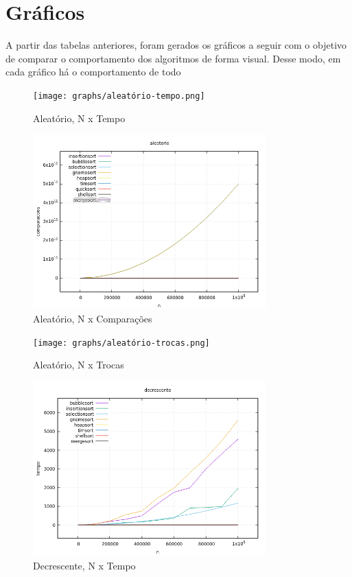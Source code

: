 \documentclass[report]{uftex}
\begin{document}
\section{Gráficos}
A partir das tabelas anteriores, foram gerados os gráficos a seguir com o objetivo de comparar o comportamento dos algoritmos de forma visual. Desse modo, em cada gráfico há o comportamento de todo

\begin{figure}[h]
\centering
\caption{Aleatório, N x Tempo}
\texttt{[image: graphs/aleatório-tempo.png]}
\end{figure}

\begin{figure}[h]
\centering
\caption{Aleatório, N x Comparações}
\includegraphics[width=0.8\textwidth]{graphs/aleatório-comparações.png}
\end{figure}

\begin{figure}[h]
\centering
\caption{Aleatório, N x Trocas}
\texttt{[image: graphs/aleatório-trocas.png]}
\end{figure}


\begin{figure}[h]
\centering
\caption{Decrescente, N x Tempo}
\includegraphics[width=0.8\textwidth]{graphs/decrescente-tempo.png}
\end{figure}
\end{document}

